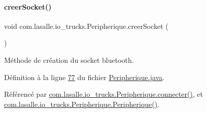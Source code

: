\paragraph{\texorpdfstring{creer\+Socket()}{creerSocket()}}
{\footnotesize\ttfamily void com.\+lasalle.\+io\+\_\+trucks.\+Peripherique.\+creer\+Socket (\begin{DoxyParamCaption}{ }\end{DoxyParamCaption})\hspace{0.3cm}{\ttfamily [private]}}



Méthode de création du socket bluetooth. 



Définition à la ligne \hyperlink{_peripherique_8java_source_l00077}{77} du fichier \hyperlink{_peripherique_8java_source}{Peripherique.\+java}.



Référencé par \hyperlink{_peripherique_8java_source_l00183}{com.\+lasalle.\+io\+\_\+trucks.\+Peripherique.\+connecter()}, et \hyperlink{_peripherique_8java_source_l00054}{com.\+lasalle.\+io\+\_\+trucks.\+Peripherique.\+Peripherique()}.


